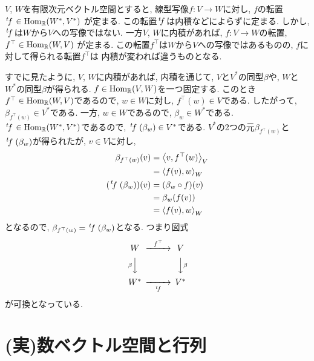 \begin{remark}
  $V$, $W$を有限次元ベクトル空間とすると,
  線型写像$f\colon V\to W$に対し,
  $f$の転置
  $\left.^{t}\!f\right.\in\operatorname{Hom}_{\mathbb{R}}(W^\ast,V^\ast)$
  が定まる.
  この転置$\left.^{t}\!f\right.$は内積などによらずに定まる.
  しかし, $\left.^{t}\!f\right.$は$W$から$V$への写像ではない.
  一方$V$, $W$に内積があれば,
  $f\colon V\to W$の転置,
  $f^\top\in\operatorname{Hom}_{\mathbb{R}}(W,V)$
  が定まる.
  この転置$f^\top$は$W$から$V$への写像ではあるものの,
  $f$に対して得られる転置$f^\top$は
  内積が変われば違うものとなる.

  すでに見たように,
  $V$, $W$に内積があれば,
  内積を通じて,
  $V$と$V^\ast$の同型$\beta$や,
  $W$と$W^\ast$の同型$\beta$が得られる.
  $f\in \operatorname{Hom}_{\mathbb{R}}(V,W)$を一つ固定する.
  このとき$f^\top \in \operatorname{Hom}_{\mathbb{R}}(W,V)$であるので,
  $w\in W$に対し, $f^\top(w)\in V$である.
  したがって, $\beta_{f^\top(w)}\in V^\ast$である.
  一方, $w\in W$であるので, $\beta_w\in W^\ast$である.
  $\left.^{t}\!f\right.\in \operatorname{Hom}_{\mathbb{R}}(W^\ast,V^\ast)$であるので,
  $\left.^{t}\!f\right.(\beta_w)\in V^\ast$である.
  $V^\ast$の2つの元$\beta_{f^\top(w)}$と$\left.^{t}\!f\right.(\beta_w)$が得られたが,
  $v\in V$に対し,
  \begin{align*}
    \beta_{f^\top(w)}(v)
    &=\Braket{v,f^\top(w)}_V\\
    &=\Braket{f(v),w}_W\\
    (\left.^{t}\!f\right.(\beta_w))(v)
    &=(\beta_w\circ f)(v)\\
    &=\beta_w(f(v))\\
    &=\Braket{f(v),w}_W
  \end{align*}
  となるので,
  $\beta_{f^\top(w)}=\left.^{t}\!f\right.(\beta_w)$となる.
  つまり図式
  \begin{align*}
    \begin{CD}
      W @>f^\top>> V\\
      @V\beta VV @VV\beta V\\
      W^\ast @>>\transposed{f}> V^\ast
    \end{CD}
  \end{align*}
  が可換となっている.
\end{remark}


\section{(実)数ベクトル空間と行列}
